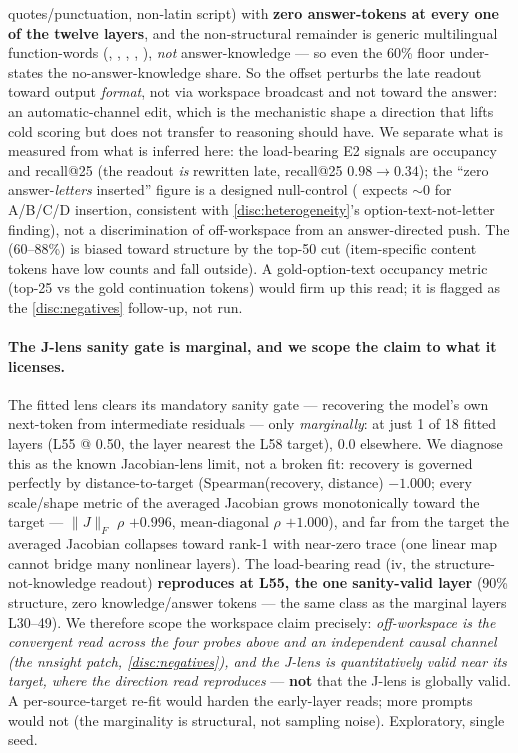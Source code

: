 quotes/punctuation, non-latin script) with \textbf{zero answer-tokens at every one
of the twelve layers}, and the non-structural remainder is generic multilingual
function-words (, , , ,
), \emph{not} answer-knowledge --- so even the 60\% floor under-states
the no-answer-knowledge share. So the offset perturbs the late readout toward
output \emph{format}, not via workspace broadcast and not toward the answer: an
automatic-channel edit, which is the mechanistic shape a direction that lifts cold
scoring but does not transfer to reasoning should have. We separate what is
measured from what is inferred here: the load-bearing E2 signals are occupancy and
recall@25 (the readout \emph{is} rewritten late, recall@25
$0.98{\rightarrow}0.34$); the ``zero answer-\emph{letters} inserted'' figure is a
designed null-control ( expects ${\sim}0$ for A/B/C/D
insertion, consistent with \cref{disc:heterogeneity}'s option-text-not-letter
finding), not a discrimination of off-workspace from an answer-directed push. The
 (60--88\%) is biased toward structure by the top-50 cut
(item-specific content tokens have low counts and fall outside). A
gold-option-text occupancy metric (top-25 vs the gold continuation tokens) would
firm up this read; it is flagged as the \cref{disc:negatives} follow-up, not run.

\paragraph{The J-lens sanity gate is marginal, and we scope the claim to what it
licenses.}
The fitted lens clears its mandatory sanity gate --- recovering the model's own
next-token from intermediate residuals --- only \emph{marginally}: at just 1 of 18
fitted layers (L55 @ 0.50, the layer nearest the L58 target), 0.0 elsewhere. We
diagnose this as the known Jacobian-lens limit, not a broken fit: recovery is
governed perfectly by distance-to-target (Spearman(recovery, distance) $-1.000$;
every scale/shape metric of the averaged Jacobian grows monotonically toward the
target --- $\|J\|_F$ $\rho$ $+0.996$, mean-diagonal $\rho$ $+1.000$), and far from
the target the averaged Jacobian collapses toward rank-1 with near-zero trace (one
linear map cannot bridge many nonlinear layers). The load-bearing read (iv, the
structure-not-knowledge readout) \textbf{reproduces at L55, the one sanity-valid
layer} (90\% structure, zero knowledge/answer tokens --- the same class as the
marginal layers L30--49). We therefore scope the workspace claim precisely:
\emph{off-workspace is the convergent read across the four probes above and an
independent causal channel (the nnsight patch, \cref{disc:negatives}), and the
J-lens is quantitatively valid near its target, where the direction read
reproduces} --- \textbf{not} that the J-lens is globally valid. A per-source-target
re-fit would harden the early-layer reads; more prompts would not (the marginality
is structural, not sampling noise). Exploratory, single seed.

